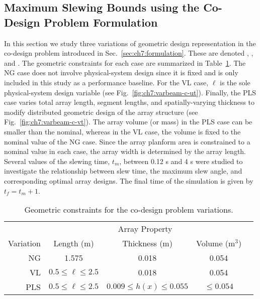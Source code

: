 \subsection{Maximum Slewing Bounds using the Co-Design Problem Formulation}

In this section we study three variations of geometric design representation in the co-design problem introduced in Sec.~\ref{sec:ch7:formulation}. These are denoted , , and . The geometric constraints for each case are summarized in Table~\ref{tb:ch7:parametric_study}. The NG case does not involve physical-system design since it is fixed and is only included in this study as a performance baseline. For the VL case, $\ell$ is the sole physical-system design variable (see Fig.~\ref{fig:ch7:varbeam-c-ut}). Finally, the PLS case varies total array length, segment lengths, and spatially-varying thickness to modify distributed geometric design of the array structure (see Fig.~\ref{fig:ch7:varbeam-c-vt}). The array volume (or mass) in the PLS case can be smaller than the nominal, whereas in the VL case, the volume is fixed to the nominal value of the NG case. Since the array planform area is constrained to a nominal value in each case, the array width is determined by the array length. Several values of the slewing time, $t_m$, between 0.12 s and 4 s were studied to investigate the relationship between slew time, the maximum slew angle, and corresponding optimal array designs. The final time of the simulation is given by $t_f=t_m+1$.

\begin{table}
\caption{Geometric constraints for the co-design problem variations. \label{tb:ch7:parametric_study}}
\centering
\begin{tabular}{rcccc}
\hline \hline
& \multicolumn{3}{c}{Array Property} \\
Variation & Length (m) & Thickness (m) & Volume (m$^3$) \\ 
\hline
NG & 1.575 & 0.018 & 0.054 \\
VL & $0.5 \leq \ell \leq 2.5$ & 0.018 & 0.054 \\
PLS & $0.5 \leq \ell \leq 2.5$ & $0.009 \leq h(x) \leq 0.055$ & $\leq 0.054$ \\
\hline \hline
\end{tabular}

\end{table}



